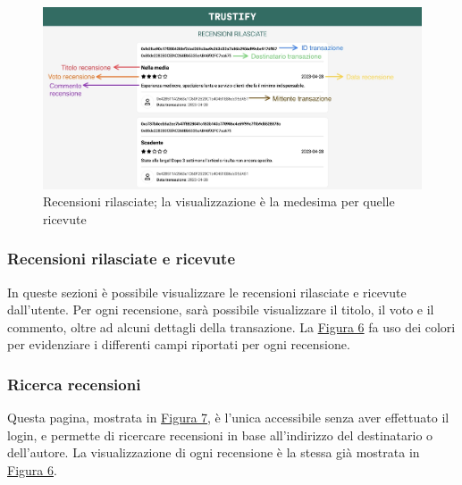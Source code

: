 \begin{figure}[H]
    \includegraphics[width=\linewidth]{src/img/recensioni_rilasciate.jpeg}
    \caption{Recensioni rilasciate; la visualizzazione è la medesima per quelle ricevute}\label{fig:recensioni_rilasciate}
\end{figure}
\pagebreak
\subsubsection{Recensioni rilasciate e ricevute}
In queste sezioni è possibile visualizzare le recensioni rilasciate e ricevute dall'utente. Per ogni recensione, sarà possibile visualizzare il titolo, il voto e il commento, oltre ad alcuni dettagli della transazione. La \hyperref[fig:recensioni_rilasciate]{Figura 6} fa uso dei colori per evidenziare i differenti campi riportati per ogni recensione.

\subsubsection{Ricerca recensioni}
Questa pagina, mostrata in \hyperref[fig:ricerca_recensioni]{Figura 7}, è l'unica accessibile senza aver effettuato il login, e permette di ricercare recensioni in base all'indirizzo del destinatario o dell'autore. La visualizzazione di ogni recensione è la stessa già mostrata in \hyperref[fig:recensioni_rilasciate]{Figura 6}.

